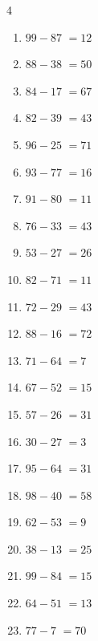 \begin{multicols}{4}
\begin{enumerate}
  \item $99-87$
        $=12$

  \item $88-38$
        $=50$

  \item $84-17$
        $=67$

  \item $82-39$
        $=43$

\columnbreak %

  \item $96-25$
        $=71$

  \item $93-77$
        $=16$

  \item $91-80$
        $=11$

  \item $76-33$
        $=43$

  \item $53-27$
        $=26$

  \item $82-71$
        $=11$

  \item $72-29$
        $=43$

  \item $88-16$
        $=72$

  \item $71-64$
        $=7$

  \item $67-52$
        $=15$

  \item $57-26$
        $=31$

  \item $30-27$
        $=3$

  \item $95-64$
        $=31$

  \item $98-40$
        $=58$

  \item $62-53$
        $=9$

  \item $38-13$
        $=25$

  \item $99-84$
        $=15$

  \item $64-51$
        $=13$

  \item $77-7$
        $=70$


\end{enumerate}
\end{multicols}
